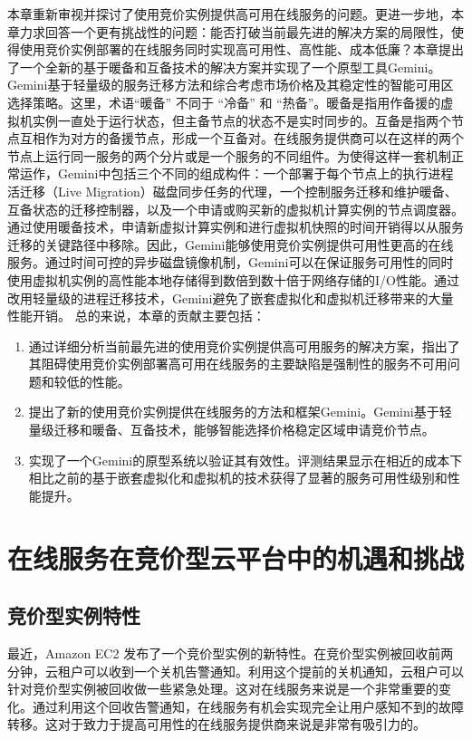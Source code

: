 本章重新审视并探讨了使用竞价实例提供高可用在线服务的问题。更进一步地，本章力求回答一个更有挑战性的问题：能否打破当前最先进的解决方案的局限性，使得使用竞价实例部署的在线服务同时实现高可用性、高性能、成本低廉？本章提出了一个全新的基于暖备和互备技术的解决方案并实现了一个原型工具Gemini。Gemini基于轻量级的服务迁移方法和综合考虑市场价格及其稳定性的智能可用区选择策略。这里，术语``暖备'' 不同于 ``冷备'' 和 ``热备''。暖备是指用作备援的虚拟机实例一直处于运行状态，但主备节点的状态不是实时同步的。互备是指两个节点互相作为对方的备援节点，形成一个互备对。在线服务提供商可以在这样的两个节点上运行同一服务的两个分片或是一个服务的不同组件。为使得这样一套机制正常运作，Gemini中包括三个不同的组成构件：一个部署于每个节点上的执行进程活迁移（Live Migration）磁盘同步任务的代理，一个控制服务迁移和维护暖备、互备状态的迁移控制器，以及一个申请或购买新的虚拟机计算实例的节点调度器。通过使用暖备技术，申请新虚拟计算实例和进行虚拟机快照的时间开销得以从服务迁移的关键路径中移除。因此，Gemini能够使用竞价实例提供可用性更高的在线服务。通过时间可控的异步磁盘镜像机制，Gemini可以在保证服务可用性的同时使用虚拟机实例的高性能本地存储得到数倍到数十倍于网络存储的I/O性能。通过改用轻量级的进程迁移技术，Gemini避免了嵌套虚拟化和虚拟机迁移带来的大量性能开销。
总的来说，本章的贡献主要包括：

\begin{enumerate}
\item 通过详细分析当前最先进的使用竞价实例提供高可用服务的解决方案，指出了其阻碍使用竞价实例部署高可用在线服务的主要缺陷是强制性的服务不可用问题和较低的性能。
\item 提出了新的使用竞价实例提供在线服务的方法和框架Gemini。Gemini基于轻量级迁移和暖备、互备技术，能够智能选择价格稳定区域申请竞价节点。
\item 实现了一个Gemini的原型系统以验证其有效性。评测结果显示在相近的成本下相比之前的基于嵌套虚拟化和虚拟机的技术获得了显著的服务可用性级别和性能提升。
\end{enumerate}

\section{在线服务在竞价型云平台中的机遇和挑战}
\subsection{竞价型实例特性}
最近，Amazon EC2 发布了一个竞价型实例的新特性。在竞价型实例被回收前两分钟，云租户可以收到一个关机告警通知。利用这个提前的关机通知，云租户可以针对竞价型实例被回收做一些紧急处理。这对在线服务来说是一个非常重要的变化。通过利用这个回收告警通知，在线服务有机会实现完全让用户感知不到的故障转移。这对于致力于提高可用性的在线服务提供商来说是非常有吸引力的。

